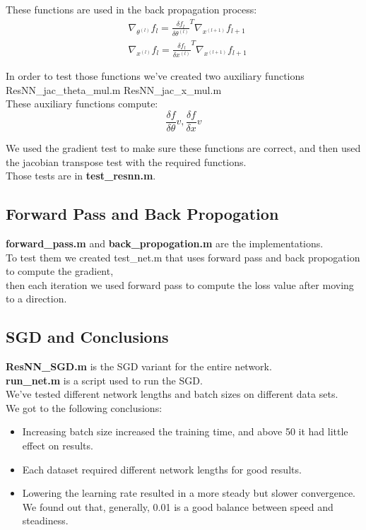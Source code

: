 \documentclass{article}
\numberwithin{equation}{section}
\begin{document}
These functions are used in the back propagation process:\\
\begin{equation*}
\begin{split}
  & \nabla_{\theta^{(l)}}f_{l} = \frac{\delta f_{l}}{\delta \theta^{(l)}}^T \nabla_{x^{(l+1)}}f_{l+1}\\
  & \nabla_{x^{(l)}}f_{l} = \frac{\delta f_{l}}{\delta x^{(l)}}^T \nabla_{x^{(l+1)}}f_{l+1}
\end{split}
\end{equation*}

In order to test those functions we've created two auxiliary functions ResNN{\_}jac{\_}theta{\_}mul.m ResNN{\_}jac{\_}x{\_}mul.m\\
These auxiliary functions compute:
\begin{equation*}
  \frac{\delta f}{\delta \theta} v, 
  \frac{\delta f}{\delta x} v
\end{equation*}

We used the gradient test to make sure these functions are correct, and then used the jacobian transpose test with the required functions.\\
Those tests are in \textbf{test{\_}resnn.m}.

\subsection{Forward Pass and Back Propogation}
\textbf{forward{\_}pass.m} and \textbf{back{\_}propogation.m} are the implementations.\\

To test them we created test{\_}net.m that uses forward pass and back propogation to compute the gradient,\\
then each iteration we used forward pass to compute the loss value after moving to a direction.\\

\subsection{SGD and Conclusions}
\textbf{ResNN{\_}SGD.m} is the SGD variant for the entire network.\\
\textbf{run{\_}net.m} is a script used to run the SGD.\\

We've tested different network lengths and batch sizes on different data sets.\\
We got to the following conclusions:\\
\begin{itemize}
  \item
  Increasing batch size increased the training time, and above 50 it had little effect on results.
  \item
  Each dataset required different network lengths for good results.
  \item
  Lowering the learning rate resulted in a more steady but slower convergence. We found out that, generally, 0.01 is a good balance between speed and steadiness.
\end{itemize}
\end{document}
